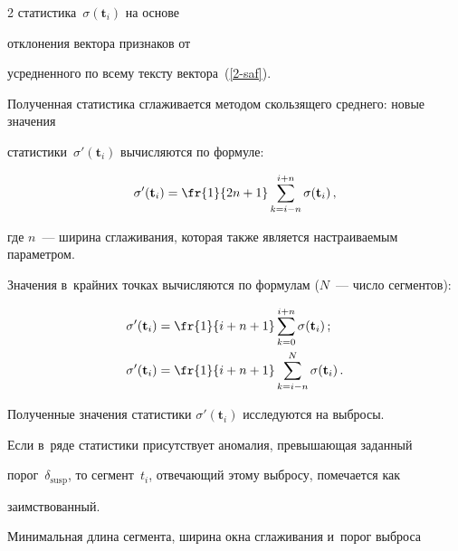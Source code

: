\begin{multicols}{2}
статистика~$\sigma (\mathbf{t}_i)$ на основе\linebreak\vspace*{-12pt}



\columnbreak



\noindent

 отклонения вектора признаков от 

усредненного по всему тексту вектора~(\ref{2-saf}).



Полученная статистика сглаживается методом скользящего среднего: новые значения 

статистики~$\sigma'(\mathbf{t}_i)$ вычисляются по формуле:



\noindent

$$

\sigma'(\mathbf{t}_i) = \fr{1}{2n+1}\sum\limits_{k=i-

n}^{i+n}\sigma(\mathbf{t}_i)\,,

$$

где $n$~--- ширина сглаживания, которая также является настраиваемым параметром. 

Значения в~крайних точках вычисляются по формулам ($N$~--- число сегментов):



\noindent

\begin{align*}

\sigma'(\mathbf{t}_i) &= 

\fr{1}{i+n+1}\sum\limits_{k=0}^{i+n}\sigma(\mathbf{t}_i)\,;

\\

\sigma'(\mathbf{t}_i)& = \fr{1}{i+n+1}\sum\limits_{k=i- n}^{N}\sigma(\mathbf{t}_i)\,.

\end{align*}



Полученные значения статистики $\sigma'(\mathbf{t}_i)$ исследуются на выбросы. 

Если в~ряде статистики присутствует аномалия, превышающая заданный 

порог~$\delta_{\mathrm{susp}}$, то сегмент~$t_i$, отвечающий этому выбросу, помечается как 

заимствованный.



Минимальная длина сегмента, ширина окна сглаживания и~порог выброса 


\end{multicols}
